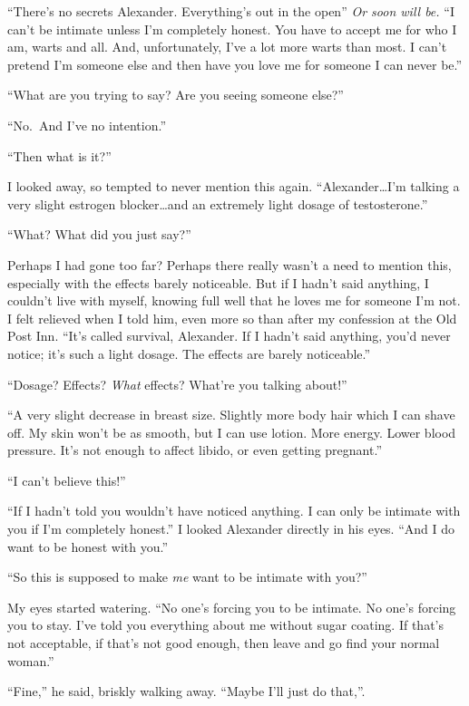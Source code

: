 ``There's no secrets Alexander. Everything's out in the open'' \emph{Or
soon will be.} ``I can't be intimate unless I'm completely honest. You
have to accept me for who I am, warts and all. And, unfortunately, I've
a lot more warts than most. I can't pretend I'm someone else and then
have you love me for someone I can never be.''

``What are you trying to say? Are you seeing someone else?''

``No.~And I've no intention.''

``Then what is it?''

I looked away, so tempted to never mention this again.
``Alexander\ldots I'm talking a very slight estrogen blocker\ldots and
an extremely light dosage of testosterone.''

``What? What did you just say?''

Perhaps I had gone too far? Perhaps there really wasn't a need to
mention this, especially with the effects barely noticeable. But if I
hadn't said anything, I couldn't live with myself, knowing full well
that he loves me for someone I'm not. I felt relieved when I told him,
even more so than after my confession at the Old Post Inn. ``It's called
survival, Alexander. If I hadn't said anything, you'd never notice; it's
such a light dosage. The effects are barely noticeable.''

``Dosage? Effects? \emph{What} effects? What're you talking about!''

``A very slight decrease in breast size. Slightly more body hair which I
can shave off. My skin won't be as smooth, but I can use lotion. More
energy. Lower blood pressure. It's not enough to affect libido, or even
getting pregnant.''

``I can't believe this!''

``If I hadn't told you wouldn't have noticed anything. I can only be
intimate with you if I'm completely honest.'' I looked Alexander
directly in his eyes. ``And I do want to be honest with you.''

``So this is supposed to make \emph{me} want to be intimate with you?''

My eyes started watering. ``No one's forcing you to be intimate. No
one's forcing you to stay. I've told you everything about me without
sugar coating. If that's not acceptable, if that's not good enough, then
leave and go find your normal woman.''

``Fine,'' he said, briskly walking away. ``Maybe I'll just do that,''.

